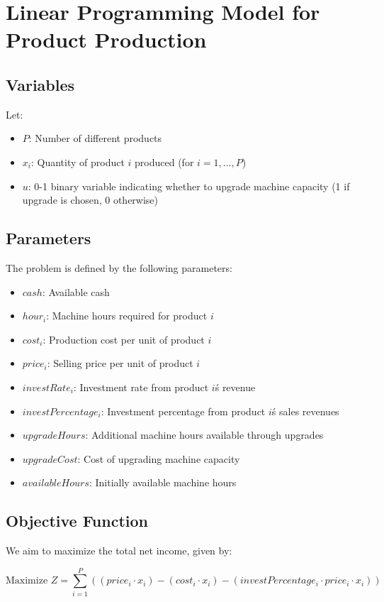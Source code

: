 \documentclass{article}
\begin{document}
\section*{Linear Programming Model for Product Production}

\subsection*{Variables}
Let:
\begin{itemize}
    \item $P$: Number of different products
    \item $x_i$: Quantity of product $i$ produced (for $i = 1, \ldots, P$)
    \item $u$: 0-1 binary variable indicating whether to upgrade machine capacity (1 if upgrade is chosen, 0 otherwise)
\end{itemize}

\subsection*{Parameters}
The problem is defined by the following parameters:
\begin{itemize}
    \item $cash$: Available cash
    \item $hour_i$: Machine hours required for product $i$
    \item $cost_i$: Production cost per unit of product $i$
    \item $price_i$: Selling price per unit of product $i$
    \item $investRate_i$: Investment rate from product $i$\'s revenue
    \item $investPercentage_i$: Investment percentage from product $i$\'s sales revenues
    \item $upgradeHours$: Additional machine hours available through upgrades
    \item $upgradeCost$: Cost of upgrading machine capacity
    \item $availableHours$: Initially available machine hours
\end{itemize}

\subsection*{Objective Function}
We aim to maximize the total net income, given by:

\[
\text{Maximize } Z = \sum_{i=1}^{P} \left( (price_i \cdot x_i) - (cost_i \cdot x_i) - (investPercentage_i \cdot price_i \cdot x_i) \right)
\]
\end{document}
